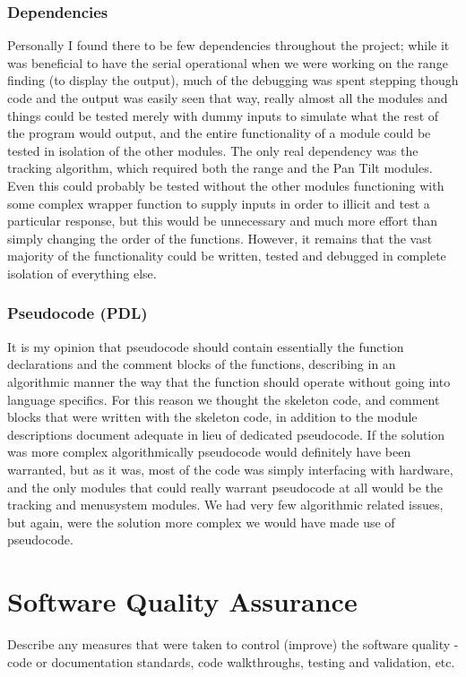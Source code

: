 \documentclass[]{report}
\begin{document}
\subsubsection{Dependencies}
Personally I found there to be few dependencies throughout the project; while it was beneficial to have the serial operational when we were working on the range finding (to display the output), much of the debugging was spent stepping though code and the output was easily seen that way, really almost all the modules and things could be tested merely with dummy inputs to simulate what the rest of the program would output, and the entire functionality of a module could be tested in isolation of the other modules. The only real dependency was the tracking algorithm, which required both the range and the Pan Tilt modules. Even this could probably be tested without the other modules functioning with some complex wrapper function to supply inputs in order to illicit and test a particular response, but this would be unnecessary and much more effort than simply changing the order of the functions. However, it remains that the vast majority of the functionality could be written, tested and debugged in complete isolation of everything else.

\subsubsection{Pseudocode (PDL)}
It is my opinion that pseudocode should contain essentially the function declarations and the comment blocks of the functions, describing in an algorithmic manner the way that the function should operate without going into language specifics. For this reason we thought the skeleton code, and comment blocks that were written with the skeleton code, in addition to the module descriptions document adequate in lieu of dedicated pseudocode. If the solution was more complex algorithmically pseudocode would definitely have been warranted, but as it was, most of the code was simply interfacing with hardware, and the only modules that could really warrant pseudocode at all would be the tracking and menusystem modules. We had very few algorithmic related issues, but again, were the solution more complex we would have made use of pseudocode.

\section{Software Quality Assurance}
Describe any measures that were taken to control (improve) the software quality - code or documentation standards, code walkthroughs, testing and validation, etc.
\end{document}
